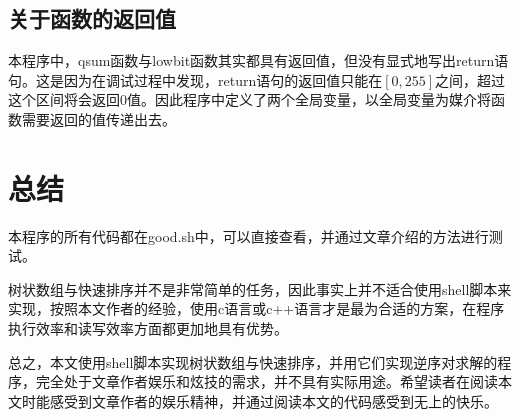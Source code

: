 \documentclass[UTF8]{ctexart}
\begin{document}
\subsection{关于函数的返回值}

本程序中，qsum函数与lowbit函数其实都具有返回值，但没有显式地写出return语句。这是因为在调试过程中发现，return语句的返回值只能在$[0,255]$之间，超过这个区间将会返回0值。因此程序中定义了两个全局变量，以全局变量为媒介将函数需要返回的值传递出去。

\section{总结}

本程序的所有代码都在good.sh中，可以直接查看，并通过文章介绍的方法进行测试。

树状数组与快速排序并不是非常简单的任务，因此事实上并不适合使用shell脚本来实现，按照本文作者的经验，使用c语言或c++语言才是最为合适的方案，在程序执行效率和读写效率方面都更加地具有优势。

总之，本文使用shell脚本实现树状数组与快速排序，并用它们实现逆序对求解的程序，完全处于文章作者娱乐和炫技的需求，并不具有实际用途。希望读者在阅读本文时能感受到文章作者的娱乐精神，并通过阅读本文的代码感受到无上的快乐。
\end{document}
